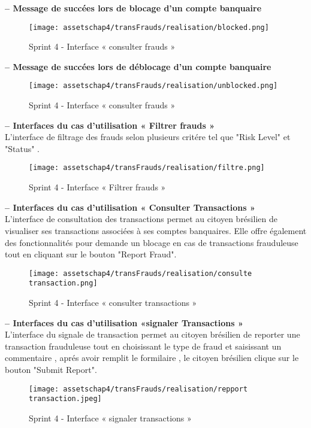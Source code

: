 \textbf{– Message de succées lors de blocage d'un compte banquaire}\\

\begin{figure}[H]
    \centering
    \texttt{[image: assetschap4/transFrauds/realisation/blocked.png]}
    \caption{ Sprint 4 - Interface « consulter frauds »}
    \label{fig:5.27}
\end{figure}

\textbf{– Message de succées lors de déblocage d'un compte banquaire}\\

\begin{figure}[H]
    \centering
    \texttt{[image: assetschap4/transFrauds/realisation/unblocked.png]}
    \caption{ Sprint 4 - Interface « consulter frauds »}
    \label{fig:5.27}
\end{figure}













\textbf{– Interfaces du cas d'utilisation « Filtrer frauds »}\\
L'interface de filtrage des frauds selon plusieurs critére tel que "Risk Level" et "Status" .
\begin{figure}[H]
    \centering

    \texttt{[image: assetschap4/transFrauds/realisation/filtre.png]}
    \caption{ Sprint 4 - Interface « Filtrer frauds »}
    \label{fig:5.27}
\end{figure}


\textbf{– Interfaces du cas d'utilisation « Consulter Transactions »}\\
L'interface de consultation des transactions permet au citoyen brésilien de visualiser ses transactions associées à ses comptes banquaires. Elle offre également des fonctionnalités pour demande un blocage en cas de transactions frauduleuse tout en cliquant sur le bouton "Report Fraud".
\begin{figure}[H]
    \centering
    \texttt{[image: assetschap4/transFrauds/realisation/consulte transaction.png]}
    \caption{Sprint 4 - Interface « consulter transactions »}
    \label{fig:5.28}
\end{figure}




\textbf{– Interfaces du cas d'utilisation «signaler Transactions »}\\
L'interface du signale de transaction permet au citoyen brésilien de reporter une transaction frauduleuse tout en choisissant le type de fraud et saisissant un commentaire , aprés avoir remplit le formilaire , le citoyen brésilien clique sur le bouton  "Submit Report".
\begin{figure}[H]
    \centering
    \texttt{[image: assetschap4/transFrauds/realisation/repport transaction.jpeg]}
    \caption{Sprint 4 - Interface « signaler transactions »}
    \label{fig:5.29}
\end{figure}




